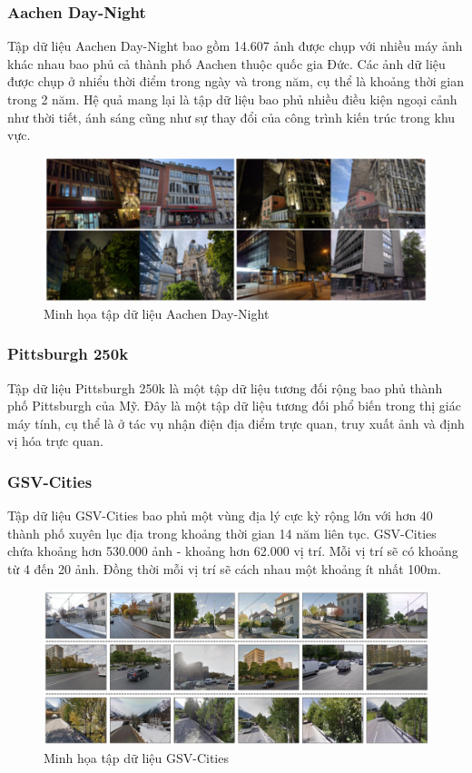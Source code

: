 \subsubsection*{Aachen Day-Night}
Tập dữ liệu Aachen Day-Night \cite{Sattler2012ImageRF} bao gồm 14.607 ảnh được chụp với nhiều máy ảnh khác nhau bao phủ cả thành phố Aachen thuộc quốc gia Đức. Các ảnh dữ liệu được chụp ở nhiểu thời điểm trong ngày và trong năm, cụ thể là khoảng thời gian trong 2 năm. Hệ quả mang lại là tập dữ liệu bao phủ nhiều điều kiện ngoại cảnh như thời tiết, ánh sáng cũng như sự thay đổi của công trình kiến trúc trong khu vực.
\begin{figure}[H]
    \centering
    \includegraphics[width=\textwidth]{pics/Chapter2/aachen.png}
    \caption{Minh họa tập dữ liệu Aachen Day-Night \cite{Sattler2012ImageRF}}
\end{figure}
\subsubsection*{Pittsburgh 250k}
Tập dữ liệu Pittsburgh 250k \cite{6618963} là một tập dữ liệu tương đối rộng bao phủ thành phố Pittsburgh của Mỹ. Đây là một tập dữ liệu tương đối phổ biến trong thị giác máy tính, cụ thể là ở tác vụ nhận điện địa điểm trực quan, truy xuất ảnh và định vị hóa trực quan.

\subsubsection*{GSV-Cities}
Tập dữ liệu GSV-Cities \cite{Ali_bey_2022} bao phủ một vùng địa lý cực kỳ rộng lớn với hơn 40 thành phố xuyên lục địa trong khoảng thời gian 14 năm liên tục. GSV-Cities chứa khoảng hơn 530.000 ảnh - khoảng hơn 62.000 vị trí. Mỗi vị trí sẽ có khoảng từ 4 đến 20 ảnh. Đồng thời mỗi vị trí sẽ cách nhau một khoảng ít nhất 100m.
\begin{figure}[H]
    \centering
    \includegraphics[width=\textwidth]{pics/Chapter2/gsv.png}
    \caption{Minh họa tập dữ liệu GSV-Cities \cite{Ali_bey_2022}}
\end{figure}

